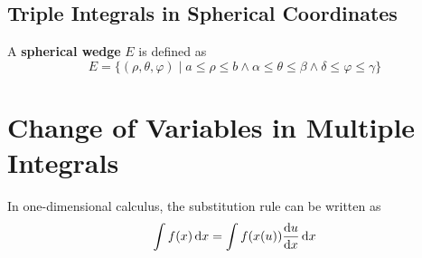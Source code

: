 \documentclass[../Calculus \Roman{3}.tex]{subfiles}
\begin{document}
		\subsection*{Triple Integrals in Spherical Coordinates}
				A \textbf{spherical wedge} $E$ is defined as
					\[E = \{(\rho, \theta, \varphi) \mid a \le \rho \le b \land \alpha \le \theta \le \beta \land \delta \le \varphi \le \gamma\}\]
	\section{Change of Variables in Multiple Integrals}
		In one-dimensional calculus, the substitution rule can be written as 
			\[\int f(x)\,\mathrm{d} x = \int f(x(u))\frac{\mathrm{d} u}{\mathrm{d} x}\,\mathrm{d} x\]
\end{document}
